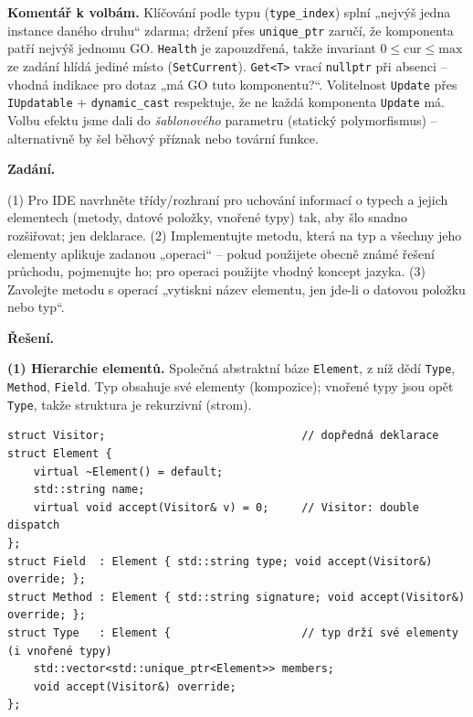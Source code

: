 \documentclass[11pt,a4paper]{article}
\newcommand{\cd}{\lstinline[style=cpp]}
\begin{document}
\begin{priklad}
\textbf{Komentář k volbám.} Klíčování podle typu (\cd{type_index}) splní „nejvýš jedna instance daného druhu`` zdarma; držení přes \cd{unique_ptr} zaručí, že komponenta patří nejvýš jednomu GO. \texttt{Health} je zapouzdřená, takže invariant $0 \le \text{cur} \le \text{max}$ ze zadání hlídá jediné místo (\texttt{SetCurrent}). \cd{Get<T>} vrací \cd{nullptr} při absenci -- vhodná indikace pro dotaz „má GO tuto komponentu?{}``. Volitelnost \texttt{Update} přes \texttt{IUpdatable} + \cd{dynamic_cast} respektuje, že ne každá komponenta \texttt{Update} má. Volbu efektu jsme dali do \emph{šablonového} parametru (statický polymorfismus) -- alternativně by šel běhový příznak nebo tovární funkce.
\end{priklad}

\begin{priklad}
\par

\textbf{Zadání.}\par
(1) Pro IDE navrhněte třídy/rozhraní pro uchování informací o typech a jejich elementech (metody, datové položky, vnořené typy) tak, aby šlo snadno rozšiřovat; jen deklarace. (2) Implementujte metodu, která na typ a všechny jeho elementy aplikuje zadanou „operaci`` -- pokud použijete obecně známé řešení průchodu, pojmenujte ho; pro operaci použijte vhodný koncept jazyka. (3) Zavolejte metodu s operací „vytiskni název elementu, jen jde-li o datovou položku nebo typ``.

\medskip
\textbf{Řešení.}\par
\textbf{(1) Hierarchie elementů.} Společná abstraktní báze \texttt{Element}, z níž dědí \texttt{Type}, \texttt{Method}, \texttt{Field}. Typ obsahuje své elementy (kompozice); vnořené typy jsou opět \texttt{Type}, takže struktura je rekurzivní (strom).

\begin{lstlisting}[style=cpp]
struct Visitor;                              // dopředná deklarace
struct Element {
    virtual ~Element() = default;
    std::string name;
    virtual void accept(Visitor& v) = 0;     // Visitor: double dispatch
};
struct Field  : Element { std::string type; void accept(Visitor&) override; };
struct Method : Element { std::string signature; void accept(Visitor&) override; };
struct Type   : Element {                    // typ drží své elementy (i vnořené typy)
    std::vector<std::unique_ptr<Element>> members;
    void accept(Visitor&) override;
};
\end{lstlisting}


\end{priklad}
\end{document}
